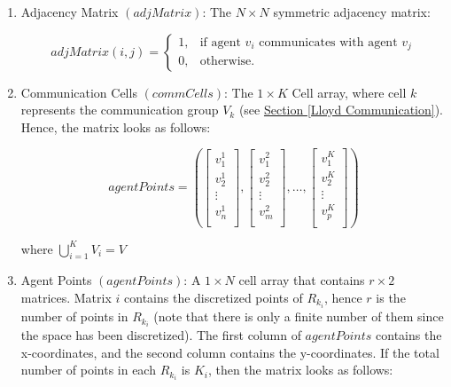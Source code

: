 \documentclass[../CourseManual.tex]{subfiles}
\begin{document}
\begin{enumerate}
  \item Adjacency Matrix $(adjMatrix)$: The $N \times N$ symmetric adjacency matrix:
  
  $$adjMatrix(i,j) = 
  \begin{cases}
    1, & \text{if agent $v_i$ communicates with agent $v_j$}\\
    0, & \text{otherwise.}
  \end{cases}$$
  
  \item Communication Cells $(commCells)$: The $1 \times K$ Cell array, where cell $k$ represents the communication group $V_{k}$ (see \hyperref[Lloyd Communication]{Section \ref{Lloyd Communication}}). Hence, the matrix looks as follows:
  
  $$agentPoints = 
  (\begin{bmatrix}
    v^{1}_{1}\\
    v^{1}_{2}\\
    \vdots\\
    v^{1}_{n}\\
  \end{bmatrix}, 
  \begin{bmatrix}
    v^{2}_{1}\\
    v^{2}_{2}\\
    \vdots\\
    v^{2}_{m}\\
  \end{bmatrix}, 
  \dots, 
  \begin{bmatrix}
    v^{K}_{1}\\
    v^{K}_{2}\\
    \vdots\\
    v^{K}_{p}\\
  \end{bmatrix})$$
  
  where $\bigcup_{i=1}^{K} V_{i} = V$
  
  \item Agent Points $(agentPoints)$: A $1 \times N$ cell array that contains $r \times 2$ matrices. Matrix $i$ contains the discretized points of $R_{k_{i}}$, hence $r$ is the number of points in $R_{k_{i}}$ (note that there is only a finite number of them since the space has been discretized). The first column of $agentPoints$ contains the x-coordinates, and the second column contains the y-coordinates. If the total number of points in each $R_{k_{i}}$ is $K_{i}$, then the matrix looks as follows:
  

\end{enumerate}
\end{document}
